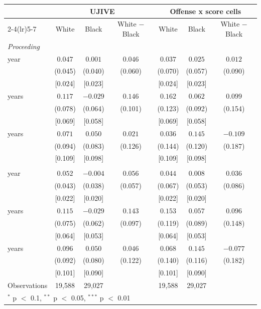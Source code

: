 \begin{tabular}{lcccccc}
\toprule
 & \multicolumn{3}{c}{UJIVE} & \multicolumn{3}{c}{Offense x score cells} \\
\cmidrule(lr){2-4}\cmidrule(lr){5-7}
 & White & Black & White $-$ Black & White & Black & White $-$ Black \\
\midrule
\multicolumn{7}{l}{\textit{Proceeding}} \\
\quad 1 year & $0.047$ & $0.001$ & $0.046$ & $0.037$ & $0.025$ & $0.012$ \\
 & (0.045) & (0.040) & (0.060) & (0.070) & (0.057) & (0.090) \\
 & [0.024] & [0.023] &  & [0.024] & [0.023] &  \\
\quad 2 years & $0.117$ & $-0.029$ & $0.146$ & $0.162$ & $0.062$ & $0.099$ \\
 & (0.078) & (0.064) & (0.101) & (0.123) & (0.092) & (0.154) \\
 & [0.069] & [0.058] &  & [0.069] & [0.058] &  \\
\quad 3 years & $0.071$ & $0.050$ & $0.021$ & $0.036$ & $0.145$ & $-0.109$ \\
 & (0.094) & (0.083) & (0.126) & (0.144) & (0.120) & (0.187) \\
 & [0.109] & [0.098] &  & [0.109] & [0.098] &  \\
\addlinespace
\multicolumn{7}{l}{\textit{Revoked}} \\
\quad 1 year & $0.052$ & $-0.004$ & $0.056$ & $0.044$ & $0.008$ & $0.036$ \\
 & (0.043) & (0.038) & (0.057) & (0.067) & (0.053) & (0.086) \\
 & [0.022] & [0.020] &  & [0.022] & [0.020] &  \\
\quad 2 years & $0.115$ & $-0.029$ & $0.143$ & $0.153$ & $0.057$ & $0.096$ \\
 & (0.075) & (0.062) & (0.097) & (0.119) & (0.089) & (0.148) \\
 & [0.064] & [0.053] &  & [0.064] & [0.053] &  \\
\quad 3 years & $0.096$ & $0.050$ & $0.046$ & $0.068$ & $0.145$ & $-0.077$ \\
 & (0.092) & (0.080) & (0.122) & (0.140) & (0.116) & (0.182) \\
 & [0.101] & [0.090] &  & [0.101] & [0.090] &  \\
\midrule
Observations & 19,588 & 29,027 &  & 19,588 & 29,027 &  \\
\bottomrule
\multicolumn{7}{l}{\footnotesize $^{*}$ p $<$ 0.1, $^{**}$ p $<$ 0.05, $^{***}$ p $<$ 0.01} \\
\end{tabular}
